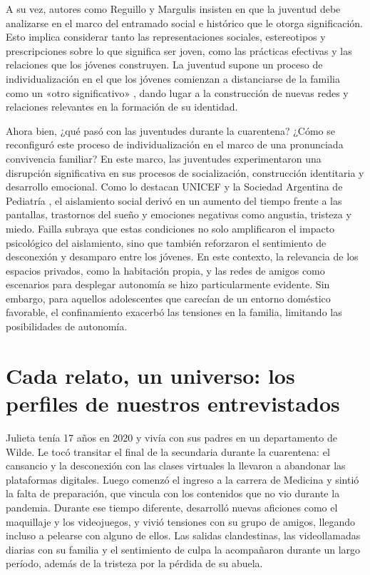 \begin{refsection}
A su vez, autores como Reguillo \protect\parencite*{4227-REGUILLO2000} y Margulis \protect\parencite*{4195-MARGULIS2001} insisten en que la juventud debe analizarse en el marco del entramado social e histórico que le otorga significación. Esto implica considerar tanto las representaciones sociales, estereotipos y prescripciones sobre lo que significa ser joven, como las prácticas efectivas y las relaciones que los jóvenes construyen. La juventud supone un proceso de individualización en el que los jóvenes comienzan a distanciarse de la familia como un «otro significativo» \protect\parencite{4266-DESINGLY2000}, dando lugar a la construcción de nuevas redes y relaciones relevantes en la formación de su identidad.

Ahora bien, ¿qué pasó con las juventudes durante la cuarentena? ¿Cómo se reconfiguró este proceso de individualización en el marco de una pronunciada convivencia familiar? En este marco, las juventudes experimentaron una disrupción significativa en sus procesos de socialización, construcción identitaria y desarrollo emocional. Como lo destacan UNICEF \protect\parencite*{4265-UNICEF2020} y la Sociedad Argentina de Pediatría \protect\parencite{4234-SAP2020}, el aislamiento social derivó en un aumento del tiempo frente a las pantallas, trastornos del sueño y emociones negativas como angustia, tristeza y miedo. Failla \protect\parencite*{4198-FAILLA2021} subraya que estas condiciones no solo amplificaron el impacto psicológico del aislamiento, sino que también reforzaron el sentimiento de desconexión y desamparo entre los jóvenes. En este contexto, la relevancia de los espacios privados, como la habitación propia, y las redes de amigos como escenarios para desplegar autonomía se hizo particularmente evidente. Sin embargo, para aquellos adolescentes que carecían de un entorno doméstico favorable, el confinamiento exacerbó las tensiones en la familia, limitando las posibilidades de autonomía.


\section[Cada relato, un universo: los perfiles de nuestros entrevistados]{Cada relato, un universo: los perfiles de nuestros entrevistados}
\label{cap-26.cada-relato-un-universo-los-perfiles-de-nuestros-entrevistados}
Julieta tenía 17 años en 2020 y vivía con sus padres en un departamento de Wilde. Le tocó transitar el final de la secundaria durante la cuarentena: el cansancio y la desconexión con las clases virtuales la llevaron a abandonar las plataformas digitales. Luego comenzó el ingreso a la carrera de Medicina y sintió la falta de preparación, que vincula con los contenidos que no vio durante la pandemia. Durante ese tiempo diferente, desarrolló nuevas aficiones como el maquillaje y los videojuegos, y vivió tensiones con su grupo de amigos, llegando incluso a pelearse con alguno de ellos. Las salidas clandestinas, las videollamadas diarias con su familia y el sentimiento de culpa la acompañaron durante un largo período, además de la tristeza por la pérdida de su abuela.


\end{refsection}
